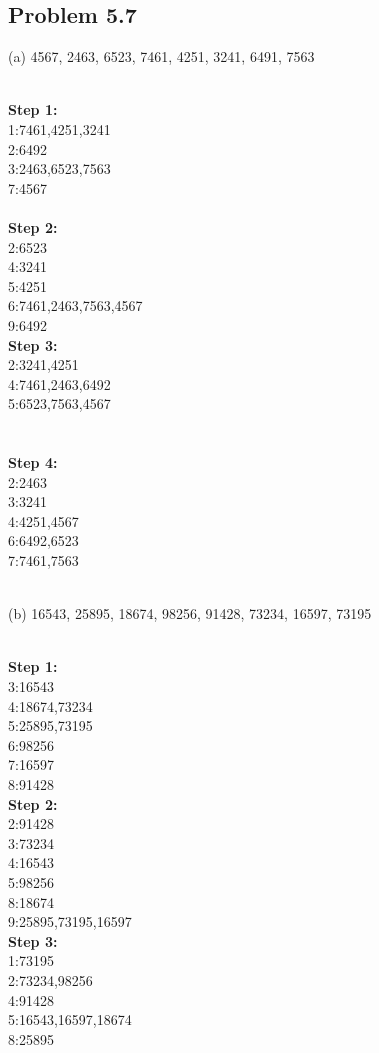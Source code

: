 \documentclass[a4paper]{article}
\begin{document}
\begin{spacing}{1.3}
\section*{Problem 5.7}
(a) 4567, 2463, 6523, 7461, 4251, 3241, 6491, 7563
\begin{multicols}{4}
\\\noindent \textbf{Step 1:} {\\1:7461,4251,3241\\2:6492\\3:2463,6523,7563\\7:4567}\\
\\\textbf{Step 2:} {\\2:6523\\4:3241\\5:4251\\6:7461,2463,7563,4567\\9:6492}
\\\textbf{Step 3:} {\\2:3241,4251\\4:7461,2463,6492\\5:6523,7563,4567}\\\\
\\\textbf{Step 4:} {\\2:2463\\3:3241\\4:4251,4567\\6:6492,6523\\7:7461,7563}
\end{multicols}
\\\noindent (b) 16543, 25895, 18674, 98256, 91428, 73234, 16597, 73195
\begin{multicols}{5}
\\\noindent \textbf{Step 1:} {\\3:16543\\4:18674,73234\\5:25895,73195\\6:98256\\7:16597\\8:91428}
\\\textbf{Step 2:} {\\2:91428\\3:73234\\4:16543\\5:98256\\8:18674\\9:25895,73195,16597}
\\\textbf{Step 3:} {\\1:73195\\2:73234,98256\\4:91428\\5:16543,16597,18674\\8:25895}\\

\end{multicols}
\end{spacing}
\end{document}
